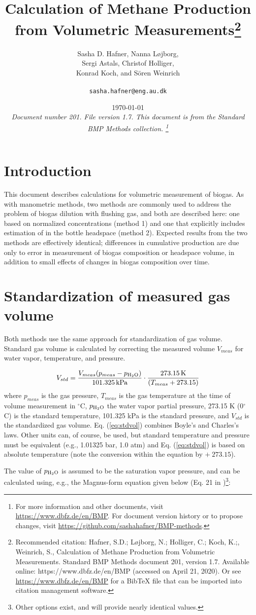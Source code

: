 \documentclass[]{article}
\title {Calculation of Methane Production from Volumetric Measurements\footnote{
  Recommended citation: 
Hafner, S.D.; L\o jborg, N.; Holliger, C.; Koch, K.;, Weinrich, S., Calculation of Methane Production from Volumetric Measurements. Standard BMP Methods document 201, version 1.7. Available online: https://www.dbfz.de/en/BMP (accessed on April 21, 2020).
\newline
  Or see \url{https://www.dbfz.de/en/BMP} for a BibTeX file that can be imported into citation management software.
}}
\author{Sasha D. Hafner, Nanna L\o jborg, \\ Sergi Astals, Christof Holliger, \\ Konrad Koch, and S{\"o}ren Weinrich\\
\\
\texttt{sasha.hafner@eng.au.dk}
}
\date{\today \\
\bigskip
\textit{
  Document number 201.
  File version 1.7. 
  This document is from the Standard BMP Methods collection.
    \footnote{For more information and other documents, visit \url{https://www.dbfz.de/en/BMP}. 
    For document version history or to propose changes, visit \url{https://github.com/sashahafner/BMP-methods}.}
}
}
\newcommand{\unit}[1]{\ensuremath{\, \mathrm{#1}}}
\begin{document}
\maketitle

\section{Introduction}
This document describes calculations for volumetric measurement of biogas.
As with manometric methods, two methods are commonly used to address the problem of biogas dilution with flushing gas, and both are described here: one based on normalized  concentrations (method 1) and one that explicitly includes estimation of  in the bottle headspace (method 2).
Expected results from the two methods are effectively identical; differences in cumulative  production are due only to error in measurement of biogas composition or headspace volume, in addition to small effects of changes in biogas composition over time.

\section{Standardization of measured gas volume}
Both methods use the same approach for standardization of gas volume.
Standard gas volume is calculated by correcting the measured volume $V_{meas}$ for water vapor, temperature, and pressure.

\begin{equation}
  \label{eq:stdvol}
  V_{std} = \frac{V_{meas}(p_{meas} - p\textsubscript{H$_2$O})} {101.325 \unit{kPa}} \cdot \frac {273.15 \unit{K}}{(T_{meas} + 273.15)}
\end{equation}
where $p_{meas}$ is the gas pressure, $T_{meas}$ is the gas temperature at the time of volume measurement in $^\circ$C, $p\textsubscript{H$_2$O}$ the water vapor partial pressure, 273.15 K (0$^\circ$C) is the standard temperature, 101.325 kPa is the standard pressure, and $V_{std}$ is the standardized gas volume.
Eq. (\ref{eq:stdvol}) combines Boyle's and Charles's laws.
Other units can, of course, be used, but standard temperature and pressure must be equivalent (e.g., 1.01325 bar, 1.0 atm) and Eq. (\ref{eq:stdvol}) is based on absolute temperature (note the conversion within the equation by $+~273.15$).

The value of $p\textsubscript{H$_2$O}$ is assumed to be the saturation vapor pressure, and can be calculated using, e.g., the Magnus-form equation given below (Eq. 21 in \citet{alduchovImprovedMagnusForm1996})\footnote{
  Other options exist, and will provide nearly identical values.
}:
\end{document}
